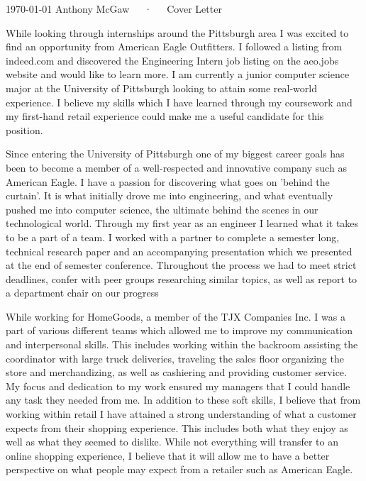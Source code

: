 \documentclass[11pt, a4paper]{awesome-cv}
\begin{document}
\makecvheader[C]

\makecvfooter
  {\today}
  {Anthony McGaw~~~·~~~Cover Letter}
  {}

\makelettertitle

\begin{cvletter}

While looking through internships around the Pittsburgh area I was excited to find an opportunity from American Eagle Outfitters. I followed a listing from indeed.com and discovered the Engineering Intern job listing on the aeo.jobs website and would like to learn more. I am currently a junior computer science major at the University of Pittsburgh looking to attain some real-world experience. I believe my skills which I have learned through my coursework and my first-hand retail experience could make me a useful candidate for this position.

Since entering the University of Pittsburgh one of my biggest career goals has been to become a member of a well-respected and innovative company such as American Eagle. I have a passion for discovering what goes on 'behind the curtain'. It is what initially drove me into engineering, and what eventually pushed me into computer science, the ultimate behind the scenes in our technological world. Through my first year as an engineer I learned what it takes to be a part of a team. I worked with a partner to complete a semester long, technical research paper and an accompanying presentation which we presented at the end of semester conference. Throughout the process we had to meet strict deadlines, confer with peer groups researching similar topics, as well as report to a department chair on our progress

While working for HomeGoods, a member of the TJX Companies Inc. I was a part of various different teams which allowed me to improve my communication and interpersonal skills. This includes working within the backroom assisting the coordinator with large truck deliveries, traveling the sales floor organizing the store and merchandizing, as well as cashiering and providing customer service. My focus and dedication to my work ensured my managers that I could handle any task they needed from me. In addition to these soft skills, I believe that from working within retail I have attained a strong understanding of what a customer expects from their shopping experience. This includes both what they enjoy as well as what they seemed to dislike. While not everything will transfer to an online shopping experience, I believe that it will allow me to have a better perspective on what people may expect from a retailer such as American Eagle. 


\end{cvletter}
\end{document}
